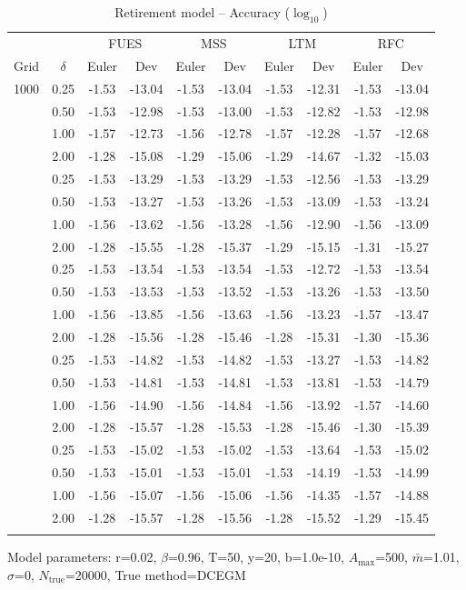 \documentclass{article}
\begin{document}
\begin{table}[htbp]
\centering
\caption{Retirement model -- Accuracy ($\log_{10}$)}
\label{tab:accuracy}
\begin{tabular}{cc|cc|cc|cc|cc}
\toprule
 & & \multicolumn{2}{c|}{FUES} & \multicolumn{2}{c|}{MSS} & \multicolumn{2}{c|}{LTM} & \multicolumn{2}{c}{RFC} \\
Grid & $\delta$ & Euler & Dev & Euler & Dev & Euler & Dev & Euler & Dev \\
\midrule
1000 & 0.25 & -1.53 & -13.04 & -1.53 & -13.04 & -1.53 & -12.31 & -1.53 & -13.04 \\
 & 0.50 & -1.53 & -12.98 & -1.53 & -13.00 & -1.53 & -12.82 & -1.53 & -12.98 \\
 & 1.00 & -1.57 & -12.73 & -1.56 & -12.78 & -1.57 & -12.28 & -1.57 & -12.68 \\
 & 2.00 & -1.28 & -15.08 & -1.29 & -15.06 & -1.29 & -14.67 & -1.32 & -15.03 \\
\addlinespace[0.5em]
2000 & 0.25 & -1.53 & -13.29 & -1.53 & -13.29 & -1.53 & -12.56 & -1.53 & -13.29 \\
 & 0.50 & -1.53 & -13.27 & -1.53 & -13.26 & -1.53 & -13.09 & -1.53 & -13.24 \\
 & 1.00 & -1.56 & -13.62 & -1.56 & -13.28 & -1.56 & -12.90 & -1.56 & -13.09 \\
 & 2.00 & -1.28 & -15.55 & -1.28 & -15.37 & -1.29 & -15.15 & -1.31 & -15.27 \\
\addlinespace[0.5em]
3000 & 0.25 & -1.53 & -13.54 & -1.53 & -13.54 & -1.53 & -12.72 & -1.53 & -13.54 \\
 & 0.50 & -1.53 & -13.53 & -1.53 & -13.52 & -1.53 & -13.26 & -1.53 & -13.50 \\
 & 1.00 & -1.56 & -13.85 & -1.56 & -13.63 & -1.56 & -13.23 & -1.57 & -13.47 \\
 & 2.00 & -1.28 & -15.56 & -1.28 & -15.46 & -1.28 & -15.31 & -1.30 & -15.36 \\
\addlinespace[0.5em]
6000 & 0.25 & -1.53 & -14.82 & -1.53 & -14.82 & -1.53 & -13.27 & -1.53 & -14.82 \\
 & 0.50 & -1.53 & -14.81 & -1.53 & -14.81 & -1.53 & -13.81 & -1.53 & -14.79 \\
 & 1.00 & -1.56 & -14.90 & -1.56 & -14.84 & -1.56 & -13.92 & -1.57 & -14.60 \\
 & 2.00 & -1.28 & -15.57 & -1.28 & -15.53 & -1.28 & -15.46 & -1.30 & -15.39 \\
\addlinespace[0.5em]
10000 & 0.25 & -1.53 & -15.02 & -1.53 & -15.02 & -1.53 & -13.64 & -1.53 & -15.02 \\
 & 0.50 & -1.53 & -15.01 & -1.53 & -15.01 & -1.53 & -14.19 & -1.53 & -14.99 \\
 & 1.00 & -1.56 & -15.07 & -1.56 & -15.06 & -1.56 & -14.35 & -1.57 & -14.88 \\
 & 2.00 & -1.28 & -15.57 & -1.28 & -15.56 & -1.28 & -15.52 & -1.29 & -15.45 \\
\addlinespace[0.5em]
\bottomrule
\end{tabular}
\vspace{0.5em}
\footnotesize{Model parameters: r=0.02, $\beta$=0.96, T=50, y=20, b=1.0e-10, $A_{\max}$=500, $\bar{m}$=1.01, $\sigma$=0, $N_{\text{true}}$=20000, True method=DCEGM}
\end{table}
\end{document}
